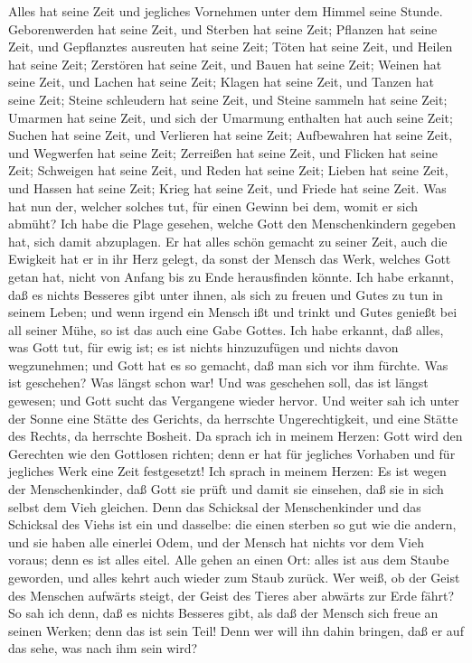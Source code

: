  Alles hat seine Zeit und jegliches Vornehmen unter dem
Himmel seine Stunde.  Geborenwerden hat seine Zeit, und
Sterben hat seine Zeit; Pflanzen hat seine Zeit, und Gepflanztes
ausreuten hat seine Zeit;  Töten hat seine Zeit, und
Heilen hat seine Zeit; Zerstören hat seine Zeit, und Bauen hat seine
Zeit;  Weinen hat seine Zeit, und Lachen hat seine Zeit;
Klagen hat seine Zeit, und Tanzen hat seine Zeit;  Steine
schleudern hat seine Zeit, und Steine sammeln hat seine Zeit; Umarmen
hat seine Zeit, und sich der Umarmung enthalten hat auch seine Zeit;
 Suchen hat seine Zeit, und Verlieren hat seine Zeit;
Aufbewahren hat seine Zeit, und Wegwerfen hat seine Zeit; 
Zerreißen hat seine Zeit, und Flicken hat seine Zeit; Schweigen hat
seine Zeit, und Reden hat seine Zeit;  Lieben hat seine
Zeit, und Hassen hat seine Zeit; Krieg hat seine Zeit, und Friede hat
seine Zeit.  Was hat nun der, welcher solches tut, für
einen Gewinn bei dem, womit er sich abmüht?  Ich habe die
Plage gesehen, welche Gott den Menschenkindern gegeben hat, sich damit
abzuplagen.  Er hat alles schön gemacht zu seiner Zeit,
auch die Ewigkeit hat er in ihr Herz gelegt, da sonst der Mensch das
Werk, welches Gott getan hat, nicht von Anfang bis zu Ende herausfinden
könnte.  Ich habe erkannt, daß es nichts Besseres gibt
unter ihnen, als sich zu freuen und Gutes zu tun in seinem Leben;
 und wenn irgend ein Mensch ißt und trinkt und Gutes
genießt bei all seiner Mühe, so ist das auch eine Gabe Gottes.
 Ich habe erkannt, daß alles, was Gott tut, für ewig ist;
es ist nichts hinzuzufügen und nichts davon wegzunehmen; und Gott hat es
so gemacht, daß man sich vor ihm fürchte.  Was ist
geschehen? Was längst schon war! Und was geschehen soll, das ist längst
gewesen; und Gott sucht das Vergangene wieder hervor. 
Und weiter sah ich unter der Sonne eine Stätte des Gerichts, da
herrschte Ungerechtigkeit, und eine Stätte des Rechts, da herrschte
Bosheit.  Da sprach ich in meinem Herzen: Gott wird den
Gerechten wie den Gottlosen richten; denn er hat für jegliches Vorhaben
und für jegliches Werk eine Zeit festgesetzt!  Ich sprach
in meinem Herzen: Es ist wegen der Menschenkinder, daß Gott sie prüft
und damit sie einsehen, daß sie in sich selbst dem Vieh gleichen.
 Denn das Schicksal der Menschenkinder und das Schicksal
des Viehs ist ein und dasselbe: die einen sterben so gut wie die andern,
und sie haben alle einerlei Odem, und der Mensch hat nichts vor dem Vieh
voraus; denn es ist alles eitel.  Alle gehen an einen
Ort: alles ist aus dem Staube geworden, und alles kehrt auch wieder zum
Staub zurück.  Wer weiß, ob der Geist des Menschen
aufwärts steigt, der Geist des Tieres aber abwärts zur Erde fährt?
 So sah ich denn, daß es nichts Besseres gibt, als daß
der Mensch sich freue an seinen Werken; denn das ist sein Teil! Denn wer
will ihn dahin bringen, daß er auf das sehe, was nach ihm sein wird?

